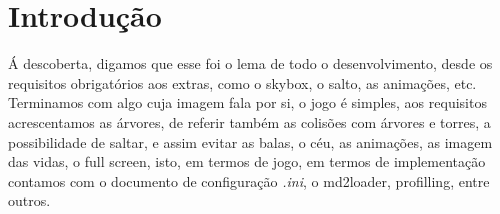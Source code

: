 \chapter{Introdução}
Á descoberta, digamos que esse foi o lema de todo o desenvolvimento, desde os requisitos obrigatórios aos extras, como o skybox, o salto, as animações, etc. Terminamos com algo cuja imagem fala por si, o jogo é simples, aos requisitos acrescentamos as árvores, de referir também as colisões com árvores e torres, a possibilidade de saltar, e assim evitar as balas, o céu, as animações, as imagem das vidas, o full screen, isto, em termos de jogo, em termos de implementação contamos com o documento de configuração \textit{.ini}, o md2loader, profilling, entre outros.
